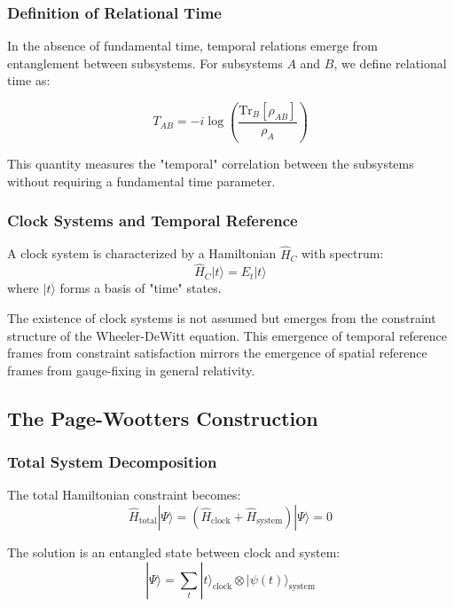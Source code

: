 \documentclass[12pt,a4paper]{article}
\newcommand{\ket}[1]{|#1\rangle}
\newcommand{\op}[1]{\hat{#1}}
\newcommand{\trace}{\text{Tr}}
\begin{document}
\subsubsection{Definition of Relational Time}

In the absence of fundamental time, temporal relations emerge from entanglement between subsystems. For subsystems $A$ and $B$, we define relational time as:

\begin{equation}
    T_{AB} = -i\log\left(\frac{\trace_B[\rho_{AB}]}{\rho_A}\right)
\end{equation}

This quantity measures the "temporal" correlation between the subsystems without requiring a fundamental time parameter.

\subsubsection{Clock Systems and Temporal Reference}

A clock system is characterized by a Hamiltonian $\op{H}_C$ with spectrum:
\begin{equation}
    \op{H}_C\ket{t} = E_t\ket{t}
\end{equation}
where $\ket{t}$ forms a basis of "time" states.

The existence of clock systems is not assumed but emerges from the constraint structure of the Wheeler-DeWitt equation. This emergence of temporal reference frames from constraint satisfaction mirrors the emergence of spatial reference frames from gauge-fixing in general relativity.

\subsection{The Page-Wootters Construction}

\subsubsection{Total System Decomposition}

The total Hamiltonian constraint becomes:
\begin{equation}
    \op{H}_{\text{total}}\ket{\Psi} = (\op{H}_{\text{clock}} + \op{H}_{\text{system}})\ket{\Psi} = 0
\end{equation}

The solution is an entangled state between clock and system:
\begin{equation}
    \ket{\Psi} = \sum_t \ket{t}_{\text{clock}} \otimes \ket{\psi(t)}_{\text{system}}
\end{equation}
\end{document}
